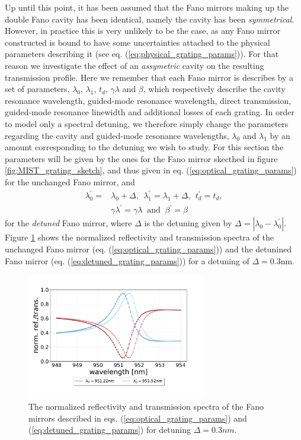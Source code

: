 Up until this point, it has been assumed that the Fano mirrors making up the double Fano cavity has been identical, namely the cavity has been \emph{symmetrical}. However, in practice this is very unlikely to be the case, as any Fano mirror constructed is bound to have some uncertainties attached to the physical parameters describing it (see eq. (\ref{eq:physical_grating_params})). For that reason we investigate the effect of an \emph{assymetric} cavity on the resulting transmission profile. Here we remember that each Fano mirror is describes by a set of parameters, $\lambda_0$, $\lambda_1$, $t_d$, $\gamma \lambda$ and $\beta$, which respectively describe the cavity resonance wavelength, guided-mode resonance wavelength, direct transmission, guided-mode resonance linewidth and additional losses of each grating. In order to model only a spectral detuning, we therefore simply change the parameters regarding the cavity and guided-mode resonance wavelengths, $\lambda_0$ and $\lambda_1$ by an amount corresponding to the detuning we wish to study. For this section the parameters will be given by the ones for the Fano mirror skecthed in figure \ref{fig:MIST_grating_sketch}, and thus given in eq. (\ref{eq:optical_grating_params}) for the unchanged Fano mirror, and
\begin{equation}
    \begin{split}
    \lambda_0^{\prime} = &\lambda_0 + \Delta,\:\: \lambda_1^{\prime} = \lambda_1 + \Delta,\:\: t_d^{\prime} = t_d,\\ &\gamma \lambda^{\prime} = \gamma \lambda\: \text{ and }\: \beta^{\prime} = \beta
    \end{split}
    \label{eq:detuned_grating_params}
\end{equation}
for the \emph{detuned} Fano mirror, where $\Delta$ is the detuning given by $\Delta = |\lambda_0 - \lambda_0^{\prime}|$. Figure \ref{fig:detuned_grating_spectra} shows the normalized reflectivity and transmission spectra of the unchanged Fano mirror (eq. (\ref{eq:optical_grating_params})) and the detunined Fano mirror (eq. (\ref{eq:detuned_grating_params})) for a detuning of $\Delta = 0.3$nm.

\begin{figure}[h!]
    \centering
    \includegraphics[width=0.7\textwidth]{figures/detuned_grating_spectra.pdf}
    \caption{The normalized reflectivity and transmission spectra of the Fano mirrors described in eqs. (\ref{eq:optical_grating_params}) and (\ref{eq:detuned_grating_params}) for detuning $\Delta = 0.3nm$.}
    \label{fig:detuned_grating_spectra}
\end{figure}

